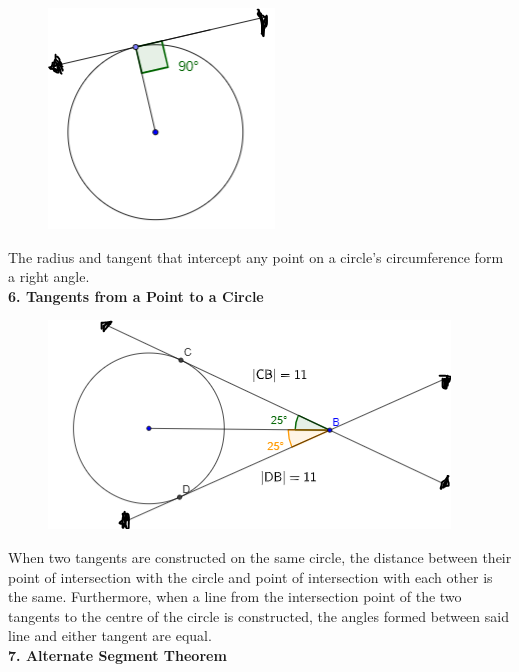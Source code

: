         \begin{figure} [hbt!]
            \centering
            \includegraphics[scale=0.75]{Resources/Unit4Circles/circle5.PNG}
        \end{figure}

        \noindent The radius and tangent that intercept any point on a circle's circumference
        form a right angle. \\

        \pagebreak
        \noindent \color{purple} \textbf{6. Tangents from a Point to a Circle} \color{black} \\

        \begin{figure} [hbt!]
            \centering
            \includegraphics[scale=0.75]{Resources/Unit4Circles/circle6.PNG}
        \end{figure}

        \noindent When two tangents are constructed on the same circle, the distance between
        their point of intersection with the circle and point of intersection with each other
        is the same. Furthermore, when a line from the intersection point of the two tangents
        to the centre of the circle is constructed, the angles formed between said line and
        either tangent are equal. \\

        \noindent \color{purple} \textbf{7. Alternate Segment Theorem} \color{black} \\

